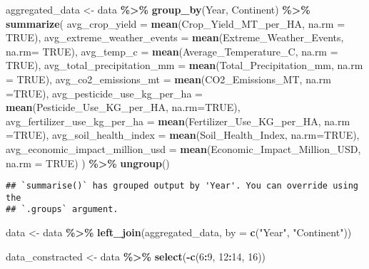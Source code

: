 \documentclass[
]{article}
\newenvironment{Shaded}{\begin{snugshade}}{\end{snugshade}}
\newcommand{\AttributeTok}[1]{\textcolor[rgb]{0.13,0.29,0.53}{#1}}
\newcommand{\ConstantTok}[1]{\textcolor[rgb]{0.56,0.35,0.01}{#1}}
\newcommand{\DecValTok}[1]{\textcolor[rgb]{0.00,0.00,0.81}{#1}}
\newcommand{\FunctionTok}[1]{\textcolor[rgb]{0.13,0.29,0.53}{\textbf{#1}}}
\newcommand{\NormalTok}[1]{#1}
\newcommand{\OtherTok}[1]{\textcolor[rgb]{0.56,0.35,0.01}{#1}}
\newcommand{\SpecialCharTok}[1]{\textcolor[rgb]{0.81,0.36,0.00}{\textbf{#1}}}
\newcommand{\StringTok}[1]{\textcolor[rgb]{0.31,0.60,0.02}{#1}}
\begin{document}
\begin{Shaded}
\begin{Highlighting}[]
\NormalTok{aggregated\_data }\OtherTok{\textless{}{-}}\NormalTok{ data }\SpecialCharTok{\%\textgreater{}\%}
  \FunctionTok{group\_by}\NormalTok{(Year, Continent) }\SpecialCharTok{\%\textgreater{}\%}
  \FunctionTok{summarize}\NormalTok{(}
    \AttributeTok{avg\_crop\_yield =} 
      \FunctionTok{mean}\NormalTok{(Crop\_Yield\_MT\_per\_HA, }\AttributeTok{na.rm =} \ConstantTok{TRUE}\NormalTok{),}
    \AttributeTok{avg\_extreme\_weather\_events =}
      \FunctionTok{mean}\NormalTok{(Extreme\_Weather\_Events, }\AttributeTok{na.rm=} \ConstantTok{TRUE}\NormalTok{),}
    \AttributeTok{avg\_temp\_c =} 
      \FunctionTok{mean}\NormalTok{(Average\_Temperature\_C, }\AttributeTok{na.rm =} \ConstantTok{TRUE}\NormalTok{),}
    \AttributeTok{avg\_total\_precipitation\_mm =} 
      \FunctionTok{mean}\NormalTok{(Total\_Precipitation\_mm, }\AttributeTok{na.rm =} \ConstantTok{TRUE}\NormalTok{),}
    \AttributeTok{avg\_co2\_emissions\_mt =} 
      \FunctionTok{mean}\NormalTok{(CO2\_Emissions\_MT, }\AttributeTok{na.rm =}\ConstantTok{TRUE}\NormalTok{),}
    \AttributeTok{avg\_pesticide\_use\_kg\_per\_ha =} 
      \FunctionTok{mean}\NormalTok{(Pesticide\_Use\_KG\_per\_HA, }\AttributeTok{na.rm=}\ConstantTok{TRUE}\NormalTok{),}
    \AttributeTok{avg\_fertilizer\_use\_kg\_per\_ha =} 
      \FunctionTok{mean}\NormalTok{(Fertilizer\_Use\_KG\_per\_HA, }\AttributeTok{na.rm =}\ConstantTok{TRUE}\NormalTok{),}
    \AttributeTok{avg\_soil\_health\_index =} 
      \FunctionTok{mean}\NormalTok{(Soil\_Health\_Index, }\AttributeTok{na.rm=}\ConstantTok{TRUE}\NormalTok{),}
    \AttributeTok{avg\_economic\_impact\_million\_usd =} 
      \FunctionTok{mean}\NormalTok{(Economic\_Impact\_Million\_USD, }\AttributeTok{na.rm =} \ConstantTok{TRUE}\NormalTok{)}
\NormalTok{  ) }\SpecialCharTok{\%\textgreater{}\%}
  \FunctionTok{ungroup}\NormalTok{() }
\end{Highlighting}
\end{Shaded}

\begin{verbatim}
## `summarise()` has grouped output by 'Year'. You can override using the
## `.groups` argument.
\end{verbatim}

\begin{Shaded}
\begin{Highlighting}[]
\NormalTok{data }\OtherTok{\textless{}{-}}\NormalTok{ data }\SpecialCharTok{\%\textgreater{}\%}
  \FunctionTok{left\_join}\NormalTok{(aggregated\_data, }\AttributeTok{by =} \FunctionTok{c}\NormalTok{(}\StringTok{"Year"}\NormalTok{, }\StringTok{"Continent"}\NormalTok{))}

\NormalTok{data\_constracted }\OtherTok{\textless{}{-}}\NormalTok{ data }\SpecialCharTok{\%\textgreater{}\%}
  \FunctionTok{select}\NormalTok{(}\SpecialCharTok{{-}}\FunctionTok{c}\NormalTok{(}\DecValTok{6}\SpecialCharTok{:}\DecValTok{9}\NormalTok{, }\DecValTok{12}\SpecialCharTok{:}\DecValTok{14}\NormalTok{, }\DecValTok{16}\NormalTok{))}
\end{Highlighting}
\end{Shaded}
\end{document}
